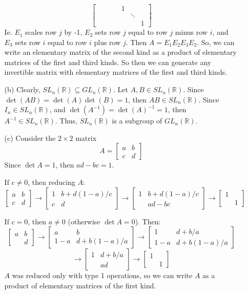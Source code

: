 \begin{itemize}
\begin{itemize}
$$\begin{bmatrix}
& & & & 1 \\
& & & & & \ddots \\
& & & & & & 1
\end{bmatrix}$$
Ie. $E_1$ scales row $j$ by -1, $E_2$ sets row $j$ equal to row $j$ minus row $i$, and $E_3$ sets row $i$ equal to row $i$ plus row $j$. Then $A = E_1E_2E_3E_2$. So, we can write an elementary matrix of the second kind as a product of elementary matrices of the first and third kinds. So then we can generate any invertible matrix with elementary matrices of the first and third kinds.
\item[(b)]
Clearly, $SL_n(\mathbb{R}) \subseteq GL_n(\mathbb{R})$. Let $A, B \in SL_n(\mathbb{R})$. Since $\det(AB) = \det(A)\det(B) = 1$, then $AB \in SL_n(\mathbb{R})$. Since $I_n \in SL_n(\mathbb{R})$, and $\det(A^{-1}) = \det(A)^{-1} = 1$, then $A^{-1} \in SL_n(\mathbb{R})$. Thus, $SL_n(\mathbb{R})$ is a subgroup of $GL_n(\mathbb{R})$. 
\item[(c)]
Consider the $2 \times 2$ matrix
$$A = \begin{bmatrix}
a & b \\
c & d
\end{bmatrix}$$
Since $\det A = 1$, then $ad - bc = 1$.

If $c \neq 0$, then reducing $A$:
$$\begin{bmatrix}
a & b \\
c & d
\end{bmatrix} \rightarrow \begin{bmatrix}
1 & b + d(1-a)/c \\
c & d
\end{bmatrix} \rightarrow \begin{bmatrix}
1 & b + d(1-a)/c \\
& ad - bc
\end{bmatrix} \rightarrow \begin{bmatrix}
1 & \\
& 1
\end{bmatrix} $$

If $c = 0$, then $a \neq 0$ (otherwise $\det A = 0$). Then:
$$\begin{bmatrix}
a & b \\
& d
\end{bmatrix} \rightarrow \begin{bmatrix}
a & b \\
1 - a & d + b(1 - a)/a
\end{bmatrix} \rightarrow \begin{bmatrix}
1 & d + b/a \\
1 - a & d + b(1 - a)/a
\end{bmatrix}$$
$$\rightarrow \begin{bmatrix}
1 & d + b/a \\
& ad
\end{bmatrix} \rightarrow \begin{bmatrix}
1 & \\
& 1
\end{bmatrix}$$
$A$ was reduced only with type 1 operations, so we can write $A$ as a product of elementary matrices of the first kind. 


\end{itemize}
\end{itemize}
